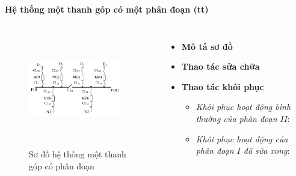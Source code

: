 \documentclass{beamer}
\begin{document}
\begin{frame}{\textbf{Hệ thống một thanh góp có một phân đoạn (tt)}}
\begin{columns}
\begin{figure}[h]
\includegraphics[width=4cm, height=5cm]{mtgcpd}
\caption{Sơ đồ hệ thống một thanh góp có phân đoạn}
\end{figure}

\begin{itemize}
\item \textbf{Mô tả sơ đồ}
\item  \textbf{Thao tác sửa chữa}
\item  \textbf{Thao tác khôi phục}
\begin{itemize}
\item<1-> \emph{Khôi phục hoạt động bình thường của phân đoạn $II$}: 
\item<1-> \emph{Khôi phục hoạt động của phân đoạn $I$ đã sửa xong}: 
\end{itemize}
\end{itemize}
\end{columns}
\end{frame}
\end{document}
